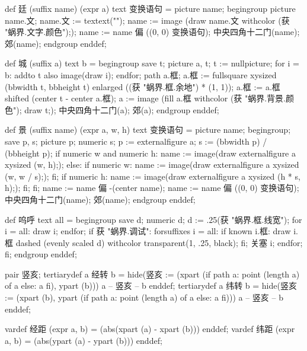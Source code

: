 \startMPinclusions[+]
def 廷 (suffix name) (expr a) text 变换语句 =
  picture name;
  begingroup
    picture name.文; name.文 := textext("");
    name := image (draw name.文 withcolor (获 "蜗界.文字.颜色"););
    name := name 偏 ((0, 0) 变换语句); 
    中央四角十二门(name); 郊(name);
  endgroup
enddef;
\stopMPinclusions

\startMPinclusions[+]
def 城 (suffix a) text b =
  begingroup
    save t;
    picture a, t; 
    t := nullpicture;
    for i = b: addto t also image(draw i); endfor;
    path a.框; 
    a.框 := fullsquare xysized (bbwidth t, bbheight t) 
            enlarged ((获 "蜗界.框.余地") * (1, 1));
    a.框 := a.框 shifted (center t - center a.框);
    a := image (fill a.框 withcolor (获 "蜗界.背景.颜色");
                draw t;);
    中央四角十二门(a); 郊(a);
  endgroup
enddef;
\stopMPinclusions

\startMPinclusions[+]
def 景 (suffix name) (expr a, w, h) text 变换语句 =
  picture name;
  begingroup;
  save p, s; picture p; numeric s;
  p := externalfigure a;
  s := (bbwidth p) / (bbheight p);
  if numeric w and numeric h:
    name := image(draw externalfigure a xysized (w, h););
  else:
    if numeric w:
      name := image(draw externalfigure a xysized (w, w / s););
    fi;
    if numeric h:
       name := image(draw externalfigure a xysized (h * s, h););
    fi;
  fi;
  name := name 偏 -(center name); %
  name := name 偏 ((0, 0) 变换语句); 
  中央四角十二门(name); 郊(name);
  endgroup
enddef;

def 呜呼 text all =
  begingroup
    save d; numeric d; d := .25(获 "蜗界.框.线宽");
    for i = all: 
      draw i; 
    endfor;
    if 获 "蜗界.调试":
      forsuffixes i = all: 
        if known i.框:
           draw i.框 dashed (evenly scaled d) withcolor transparent(1, .25, black);
        fi;
        关塞 i; 
      endfor;
    fi;
  endgroup
enddef;
\stopMPinclusions

\startMPinclusions[+]
pair 竖亥;
tertiarydef a 经转 b =
  hide(竖亥 := (xpart (if path a: point (length a) of a else: a fi), ypart (b)))
  a -- 竖亥 -- b
enddef;
tertiarydef a 纬转 b =
  hide(竖亥 := (xpart (b), ypart (if path a: point (length a) of a else: a fi)))
  a --  竖亥 -- b
enddef;
\stopMPinclusions

\startMPinclusions[+]
vardef 经距 (expr a, b) = (abs(xpart (a) - xpart (b))) enddef;
vardef 纬距 (expr a, b) = (abs(ypart (a) - ypart (b))) enddef;
\stopMPinclusions

